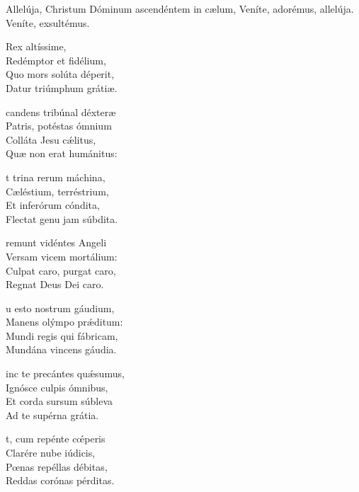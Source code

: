 \documentclass[fontsize=9pt,paper=A6,twoside,BCOR=1mm,DIV=22,headinclude]{scrarticle}
\begin{document}


\begin{multicols}{2}


\I Allelúja, Christum Dóminum ascendéntem in cælum, \red{*} Veníte, adorémus, allelúja. 
 Veníte, exsultémus.

\begin{hymnus}
 Rex altíssime,\\
\hspace{2.4em} Redémptor et fidélium,\\
Quo mors solúta déperit,\\
Datur triúmphum grátiæ.

candens tribúnal déxteræ\\
Patris, potéstas ómnium\\
Colláta Jesu cǽlitus,\\
Quæ non erat humánitus:

t trina rerum máchina,\\
Cæléstium, terréstrium,\\
Et inferórum cóndita,\\
Flectat genu jam súbdita.

remunt vidéntes Angeli\\
Versam vicem mortálium:\\
Culpat caro, purgat caro,\\
Regnat Deus Dei caro.

u esto nostrum gáudium,\\
Manens olýmpo prǽditum:\\
Mundi regis qui fábricam,\\
Mundána vincens gáudia.

inc te precántes quǽsumus,\\
Ignósce culpis ómnibus,\\
Et corda sursum súbleva\\
Ad te supérna grátia.

t, cum repénte cœ́peris\\
Clarére nube iúdicis,\\
Pœnas repéllas débitas,\\
Reddas corónas pérditas.


\end{hymnus}
\end{multicols}
\end{document}
